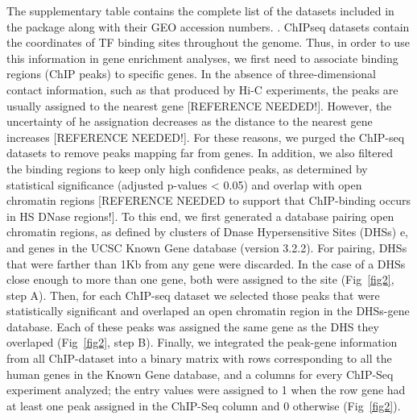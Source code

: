 \documentclass[10pt,letterpaper]{article}
\begin{document}
	The supplementary table  contains the complete list of the datasets included in the package along with their GEO accession numbers. .  
	ChIPseq datasets contain the coordinates of TF binding sites throughout the genome. Thus, in order to use this information in gene enrichment analyses, we first need to associate binding regions (ChIP peaks) to specific genes. In the absence of three-dimensional contact information, such as that produced by Hi-C experiments, the peaks are usually assigned to the nearest gene [REFERENCE NEEDED!]. However, the uncertainty of he assignation decreases as the distance to the nearest gene increases [REFERENCE NEEDED!]. For these reasons, we purged the ChIP-seq datasets to remove peaks mapping far from genes. In addition, we also filtered the binding regions to keep only high confidence peaks, as determined by statistical significance (adjusted p-values < 0.05) and overlap with open chromatin regions  [REFERENCE NEEDED to support that ChIP-binding occurs in HS DNase regions!]. To this end, we first generated a database pairing open chromatin regions, as defined by clusters of Dnase Hypersensitive Sites (DHSs) e\cite{EncodeDHS1}\cite{EncodeDHS2}, and genes in the UCSC Known Gene database (version 3.2.2)\cite{KnownGene}. For pairing, DHSs that were farther than 1Kb from any gene were discarded. In the case of a DHSs close enough to more than one gene, both were assigned to the site (Fig~\ref{fig2}, step A). Then, for each ChIP-seq dataset we selected those peaks that were statistically significant and overlaped an open chromatin region in the DHSs-gene database. Each of these peaks was assigned the same gene as the DHS they overlaped (Fig~\ref{fig2}, step B). Finally, we integrated the peak-gene information from all ChIP-dataset into a binary matrix with rows corresponding to all the human genes in the Known Gene database, and a columns for every ChIP-Seq experiment analyzed; the entry values were assigned to 1 when the row gene had at least one peak assigned in the ChIP-Seq column and 0 otherwise (Fig~\ref{fig2}).
	
\end{document}
